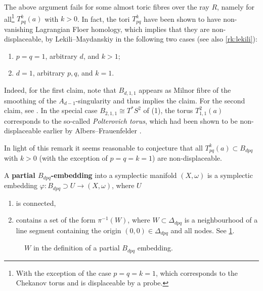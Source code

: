 \documentclass[12pt,a4paper,abstract=true,draft]{scrartcl}
\begin{document}
\begin{remark}
    The above argument fails for some almost toric fibres over the ray $R$, namely for all\footnote{With the exception of the case $p=q=k=1$, which corresponds to the Chekanov torus and is displaceable by a probe.} $T^k_{pq}(a)$ with $k > 0$.
In fact, the tori $T^k_{pq}$ have been shown to have non-vanishing Lagrangian Floer homology, which implies that they are non-displaceable, by Lekili--Maydanskiy \cite{LekMay14} in the following two cases (see also \cref{rk:lekili}):
    \begin{enumerate}
        \item $p = q = 1$, arbitrary $d$, and $k > 1$;
        \item $d = 1$, arbitrary $p,q$, and $k = 1$.
    \end{enumerate}
    Indeed, for the first claim, note that $B_{d,1,1}$ appears as Milnor fibre of the smoothing of the $A_{d-1}$-singularity and thus \cite[Proposition 2.20]{LekMay14} implies the claim.
For the second claim, see \cite[Proposition 3.6]{LekMay14}.
In the special case $B_{2,1,1} \cong T^*S^2$ of (1), the torus $T_{1,1}^2(a)$ corresponds to the so-called \emph{Polterovich torus}, which had been shown to be non-displaceable earlier by Albers--Frauenfelder \cite{AlbFra08}.
\end{remark}

In light of this remark it seems reasonable to conjecture that all $T^k_{pq}(a) \subset B_{dpq}$ with $k > 0$ (with the exception of $p=q=k=1$) are non-displaceable.

\begin{definition}
    \label{def:partial_embedding}
    A \textbf{partial $B_{dpq}$-embedding} into a symplectic manifold $(X,\omega)$ is a symplectic embedding $φ:B_{dpq} ⊃ U → (X,ω)$, where $U$ 
    \begin{enumerate}
        \item is connected, 
        \item contains a set of the form $\pi^{-1}(W)$, where $W \subset \Delta_{dpq}$ is a neighbourhood of a line segment containing the origin $(0,0) \in \Delta_{dpq}$ and all nodes.
 See \cref{fig:partial-Bdpq-embedding}.   
    \end{enumerate}
\end{definition}

\begin{figure}
    \centering
    \caption{$W$ in the definition of a partial $B_{dpq}$ embedding.}
    \label{fig:partial-Bdpq-embedding}
\end{figure}
\end{document}
